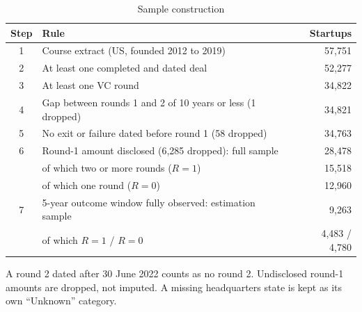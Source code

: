 \begin{table}[tbp]
\centering\footnotesize
\caption{Sample construction}
\label{tab:T3}
\begin{tabular}{clr}
\toprule
Step & Rule & Startups \\
\midrule
1 & Course extract (US, founded 2012 to 2019) & 57,751 \\
2 & At least one completed and dated deal & 52,277 \\
3 & At least one VC round & 34,822 \\
4 & Gap between rounds 1 and 2 of 10 years or less (1 dropped) & 34,821 \\
5 & No exit or failure dated before round 1 (58 dropped) & 34,763 \\
6 & Round-1 amount disclosed (6,285 dropped): full sample & 28,478 \\
  & \quad of which two or more rounds ($R=1$) & 15,518 \\
  & \quad of which one round ($R=0$) & 12,960 \\
7 & 5-year outcome window fully observed: estimation sample & 9,263 \\
  & \quad of which $R=1$ / $R=0$ & 4,483 / 4,780 \\
\bottomrule
\end{tabular}
\par\smallskip\parbox{0.9\linewidth}{\scriptsize A round 2 dated after 30 June 2022 counts as no round 2. Undisclosed round-1 amounts are dropped, not imputed. A missing headquarters state is kept as its own ``Unknown'' category.}
\end{table}
